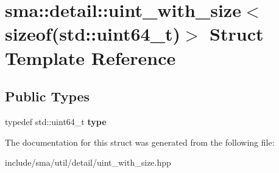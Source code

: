 \hypertarget{structsma_1_1detail_1_1uint__with__size_3_01sizeof_07std_1_1uint64__t_08_4}{\section{sma\-:\-:detail\-:\-:uint\-\_\-with\-\_\-size$<$ sizeof(std\-:\-:uint64\-\_\-t)$>$ Struct Template Reference}
\label{structsma_1_1detail_1_1uint__with__size_3_01sizeof_07std_1_1uint64__t_08_4}
}
\subsection*{Public Types}
\begin{DoxyCompactItemize}
\item 
\hypertarget{structsma_1_1detail_1_1uint__with__size_3_01sizeof_07std_1_1uint64__t_08_4_a4fc93e1e5f090e571f49a36be2b1e29f}{typedef std\-::uint64\-\_\-t {\bfseries type}}\label{structsma_1_1detail_1_1uint__with__size_3_01sizeof_07std_1_1uint64__t_08_4_a4fc93e1e5f090e571f49a36be2b1e29f}

\end{DoxyCompactItemize}


The documentation for this struct was generated from the following file\-:\begin{DoxyCompactItemize}
\item 
include/sma/util/detail/uint\-\_\-with\-\_\-size.\-hpp\end{DoxyCompactItemize}
